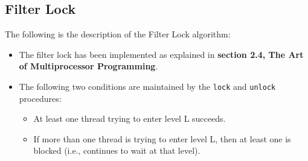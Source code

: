 \documentclass[a4paper,12pt]{report}
\begin{document}
\subsection{Filter Lock}
The following is the description of the Filter Lock algorithm:
\begin{itemize}
\item The filter lock has been implemented as explained in \textbf{section 2.4, The Art of Multiprocessor Programming}.
\item The following two conditions are maintained by the \texttt{lock} and \texttt{unlock} procedures:
\begin{itemize}
\item At least one thread trying to enter level L succeeds.
\item If more than one thread is trying to enter level L, then at least one is blocked
(i.e., continues to wait at that level).
\end{itemize}
\end{itemize}
\end{document}
